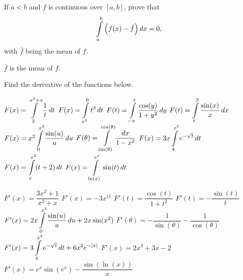 \fi


\subsection*{}
\ifanalysis
\ifanalysis\begin{Exercise}[difficulty = 1]\fi\ifcalculus\begin{Exercise}[difficulty = 2]\fi
If $a<b$ and $f$ is continuous over $[a,b]$, prove that
\[ \displaystyle \int\limits_a^b \left(f(x)- \bar{f} \right) dx=0,  \] 
with $\bar{f}$ being the mean of $f$.

\ifanalysis\end{Exercise}\fi\ifcalculus\end{Exercise}\fi

\begin{Answer}
    $\bar{f}$ is the mean  of $f$. %
\end{Answer}
\fi


\begin{Exercise}
Find the derivative of the functions below. 	\begin{multicols}{2}
		\Question[difficulty = 1] $F(x) = \displaystyle \int\limits_2^{x^3+x} \dfrac{1}{t}\, dt$ 
		\Question[difficulty = 1] $F(x) = \displaystyle \int\limits_{x^3}^0 t^3\, dt$ %
		\Question[difficulty = 1] $F(t) = \displaystyle \int\limits_{-\pi}^t\dfrac{\cos (y)}{1+y^2}\, dy$
		\Question[difficulty = 1] $F(t) = \displaystyle \int\limits_t^3\dfrac{\sin (x)}{x}\, dx$
		\ifanalysis\Question[difficulty = 1]\fi\ifcalculus\Question[difficulty = 2]\fi $F(x) = x^2 \displaystyle \int\limits_0^{x^2}\dfrac{\sin (u)}{u}\, du $
		\Question[difficulty = 1] $F(\theta) = \displaystyle \int\limits_{\sin (\theta)}^{\cos (\theta)}\dfrac{dx}{1-x^2}$
		\ifanalysis\Question[difficulty = 1]\fi\ifcalculus\Question[difficulty = 2]\fi $F(x) = 3x \displaystyle \int\limits_4^{x^2} e^{-\sqrt{t}}\, dt $
		\Question[difficulty = 1] $F(x) = \displaystyle \int\limits_{x}^{x^2} (t+2)\, dt$ 
		\Question[difficulty = 1] $F(x) = \displaystyle \int\limits_{\ln(x)}^{e^x} \sin(t)\, dt$
		\EndCurrentQuestion
	\end{multicols}
\end{Exercise}

\begin{Answer}
   
    \begin{multicols}{2}
    	\Question $F'(x)= \dfrac{3x^2+1}{x^3+x}$ 
    	\Question $F'(x)= -3x^{11}$ 
    	\Question $F'(t)=\dfrac{\cos (t)}{1+t^2}$
    	\Question $F'(t)=-\dfrac{\sin (t)}{t}$
    	\Question $F'(x)=2x \displaystyle \int\limits_0^{x^2}\dfrac{\sin (u)}{u}\, du + 2x \sin (x^2)$
    	\Question $F'(\theta)=-\dfrac{1}{\sin(\theta)} - \dfrac{1}{\cos(\theta)}$
    	\Question $F'(x)=3 \displaystyle \int\limits_4^{x^2} e^{-\sqrt{t}}\, dt  + 6x^2e^{-|x|}$
    	\Question $F'(x) = 2x^3+3x-2$ 
    	\Question $F'(x) =  e^x\sin\left(e^x\right) - \dfrac{\sin \left( \ln (x) \right)}{x}$ 
    	 \EndCurrentQuestion
    \end{multicols}
\end{Answer}

